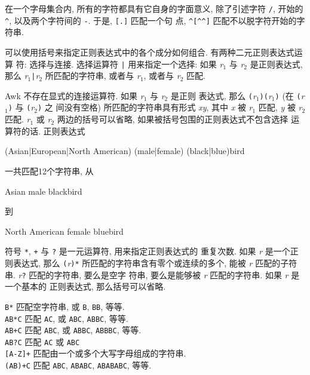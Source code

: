 在一个字母集合内, 所有的字符都具有它自身的字面意义, 除了引述字符 \verb'/',
开始的 \verb'^', 以及两个字符间的 \verb'-'. 于是, \verb'[.]' 匹配一个句
点, \verb'^[^^]' 匹配不以脱字符开始的字符串.

可以使用括号来指定正则表达式中的各个成分如何组合. 有两种二元正则表达式运算
符: 选择与连接. 选择运算符 \verb'|' 用来指定一个选择: 如果 \textit{r}$_1$
与 \textit{r}$_2$ 是正则表达式, 那么 \textit{r}$_1$\verb'|'\textit{r}$_2$
所匹配的字符串, 或者与 \textit{r}$_1$, 或者与 \textit{r}$_2$ 匹配.

Awk 不存在显式的连接运算符. 如果 \textit{r}$_1$ 与 \textit{r}$_2$ 是正则
表达式, 那么 \verb'('\textit{r}$_1$\verb')'\verb'('\textit{r}$_1$\verb')'
(在 \verb'('\textit{r}$_1$\verb')' 与 \verb'('\textit{r}$_2$\verb')' 之
间没有空格) 所匹配的字符串具有形式 \textit{xy}, 其中 \textit{x} 被
\textit{r}$_1$ 匹配, \textit{y} 被 \textit{r}$_2$ 匹配. \textit{r}$_1$ 或
\textit{r}$_2$ 两边的括号可以省略, 如果被括号包围的正则表达式不包含选择
运算符的话. 正则表达式
\begin{awkcode}
    (Asian|European|North American) (male|female) (black|blue)bird
\end{awkcode}
一共匹配12个字符串, 从
\begin{file}
    Asian male blackbird
\end{file}
到
\begin{file}
    North American female bluebird
\end{file}

符号 \verb'*', \verb'+' 与 \verb'?' 是一元运算符, 用来指定正则表达式的
重复次数. 如果 \textit{r} 是一个正则表达式, 那么
\verb'('\textit{r}\verb')'\verb'*' 所匹配的字符串含有零个或连续的多个,
能被 \textit{r} 匹配的子符串. \textit{r}\verb'?' 匹配的字符串, 要么是空字
符串, 要么是能够被 \textit{r} 匹配的字符串. 如果 \textit{r} 是一个基本的
正则表达式, 那么括号可以省略.
\begin{tabbing}
    \verb'B*' \hspace{4em} \= 匹配空字符串, 或 \verb'B', \verb'BB', 等等.\\
    \verb'AB*C' \> 匹配 \verb'AC', 或 \verb'ABC', \verb'ABBC', 等等. \\
    \verb'AB+C' \> 匹配 \verb'ABC', 或 \verb'ABBC', \verb'ABBBC', 等等.\\
    \verb'AB?C' \> 匹配 \verb'AC' 或 \verb'ABC' \\
    \verb'[A-Z]+' \> 匹配由一个或多个大写字母组成的字符串. \\
    \verb'(AB)+C' \> 匹配 \verb'ABC', \verb'ABABC', \verb'ABABABC', 等等.
\end{tabbing}

